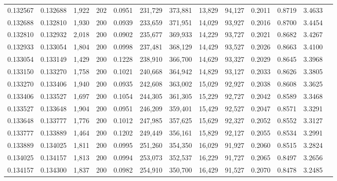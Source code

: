 \begin{tabular}{rrrrrrrrrrrrr}
0.132567 & 0.132688 &  1,922 & 202 &                                     0.0951 & 231,729 & 373,881 &  13,829 &  94,127 & 0.2011 & 0.8719 & 3.4633 \\
0.132688 & 0.132810 &  1,930 & 200 &                                     0.0939 & 233,659 & 371,951 &  14,029 &  93,927 & 0.2016 & 0.8700 & 3.4454 \\
0.132810 & 0.132932 &  2,018 & 200 &                                     0.0902 & 235,677 & 369,933 &  14,229 &  93,727 & 0.2021 & 0.8682 & 3.4267 \\
0.132933 & 0.133054 &  1,804 & 200 &                                     0.0998 & 237,481 & 368,129 &  14,429 &  93,527 & 0.2026 & 0.8663 & 3.4100 \\
0.133054 & 0.133149 &  1,429 & 200 &                                     0.1228 & 238,910 & 366,700 &  14,629 &  93,327 & 0.2029 & 0.8645 & 3.3968 \\
0.133150 & 0.133270 &  1,758 & 200 &                                     0.1021 & 240,668 & 364,942 &  14,829 &  93,127 & 0.2033 & 0.8626 & 3.3805 \\
0.133270 & 0.133406 &  1,940 & 200 &                                     0.0935 & 242,608 & 363,002 &  15,029 &  92,927 & 0.2038 & 0.8608 & 3.3625 \\
0.133406 & 0.133527 &  1,697 & 200 &                                     0.1054 & 244,305 & 361,305 &  15,229 &  92,727 & 0.2042 & 0.8589 & 3.3468 \\
0.133527 & 0.133648 &  1,904 & 200 &                                     0.0951 & 246,209 & 359,401 &  15,429 &  92,527 & 0.2047 & 0.8571 & 3.3291 \\
0.133648 & 0.133777 &  1,776 & 200 &                                     0.1012 & 247,985 & 357,625 &  15,629 &  92,327 & 0.2052 & 0.8552 & 3.3127 \\
0.133777 & 0.133889 &  1,464 & 200 &                                     0.1202 & 249,449 & 356,161 &  15,829 &  92,127 & 0.2055 & 0.8534 & 3.2991 \\
0.133889 & 0.134025 &  1,811 & 200 &                                     0.0995 & 251,260 & 354,350 &  16,029 &  91,927 & 0.2060 & 0.8515 & 3.2824 \\
0.134025 & 0.134157 &  1,813 & 200 &                                     0.0994 & 253,073 & 352,537 &  16,229 &  91,727 & 0.2065 & 0.8497 & 3.2656 \\
0.134157 & 0.134300 &  1,837 & 200 &                                     0.0982 & 254,910 & 350,700 &  16,429 &  91,527 & 0.2070 & 0.8478 & 3.2485 \\

\end{tabular}
